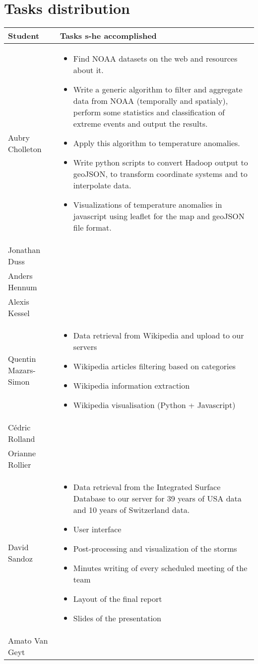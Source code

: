 \section{Tasks distribution}
\begin{tabular}{|l|p{10.5cm}|}
\hline
\textbf{Student} & \textbf{Tasks s-he accomplished} \\
\hline
Aubry Cholleton & \begin{itemize}
	\item Find NOAA datasets on the web and resources about it.
	\item Write a generic algorithm to filter and aggregate data from NOAA (temporally and spatialy), perform some statistics and classification of extreme events and output the results.
	\item Apply this algorithm to temperature anomalies.
	\item Write python scripts to convert Hadoop output to geoJSON, to transform coordinate systems and to interpolate data.
	\item Visualizations of temperature anomalies in javascript using leaflet for the map and geoJSON file format.
\end{itemize}\\
\hline
Jonathan Duss & \\
\hline
Anders Hennum & \\
\hline
Alexis Kessel & \\
\hline
Quentin Mazars-Simon & \begin{itemize}
	\item Data retrieval from Wikipedia and upload to our servers
	\item Wikipedia articles filtering based on categories
	\item Wikipedia information extraction
	\item Wikipedia visualisation (Python + Javascript)
\end{itemize}\\
\hline
Cédric Rolland &  \\
\hline
Orianne Rollier & \\
\hline
David Sandoz &
\begin{itemize}
	\item Data retrieval from the Integrated Surface Database to our server for 39 years of USA data and 10 years of Switzerland data.
	\item User interface
	\item Post-processing and visualization of the storms
	\item Minutes writing of every scheduled meeting of the team
	\item Layout of the final report
	\item Slides of the presentation
\end{itemize}\\
\hline
Amato Van Geyt & \\
\hline
\end{tabular}
